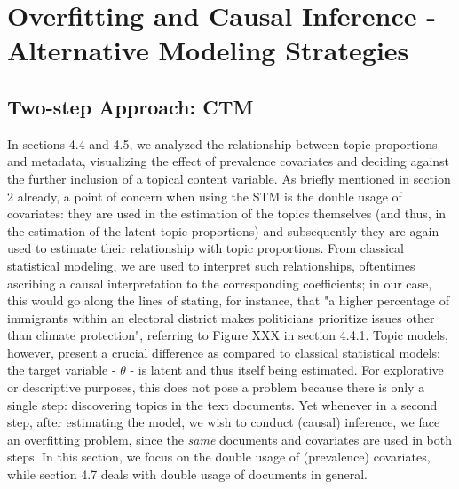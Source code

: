 \section{Overfitting and Causal Inference - Alternative Modeling Strategies}

\subsection{Two-step Approach: CTM}

In sections 4.4 and 4.5, we analyzed the relationship between topic proportions and metadata, visualizing the effect of prevalence covariates and deciding against the further inclusion of a topical content variable. As briefly mentioned in section 2 already, a point of concern when using the STM is the double usage of covariates: they are used in the estimation of the topics themselves (and thus, in the estimation of the latent topic proportions) and subsequently they are again used to estimate their relationship with topic proportions. From classical statistical modeling, we are used to interpret such relationships, oftentimes ascribing a causal interpretation to the corresponding coefficients; in our case, this would go along the lines of stating, for instance, that "a higher percentage of immigrants within an electoral district makes politicians prioritize issues other than climate protection", referring to Figure XXX in section 4.4.1. Topic models, however, present a crucial difference as compared to classical statistical models: the target variable - $\theta$ - is latent and thus itself being estimated. For explorative or descriptive purposes, this does not pose a problem because there is only a single step: discovering topics in the text documents. Yet whenever in a second step, after estimating the model, we wish to conduct (causal) inference, we face an overfitting problem, since the \textit{same} documents and covariates are used in both steps. In this section, we focus on the double usage of (prevalence) covariates, while section 4.7 deals with double usage of documents in general.

